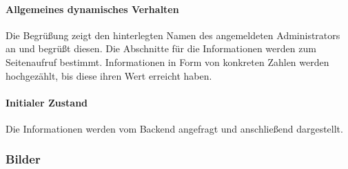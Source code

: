 \paragraph*{Allgemeines dynamisches Verhalten}
Die Begrüßung zeigt den hinterlegten Namen des angemeldeten Administrators an und begrüßt diesen.
Die Abschnitte für die Informationen werden zum Seitenaufruf bestimmt. 
Informationen in Form von konkreten Zahlen werden hochgezählt, bis diese ihren Wert erreicht haben.

\paragraph*{Initialer Zustand}
Die Informationen werden vom Backend angefragt und anschließend dargestellt.

\subsubsection*{Bilder}
\begin{minipage}{\linewidth}
    \centering
    \begin{minipage}{.69\textwidth}
        \captionsetup[figure]{labelformat=empty}
        \captionsetup[figure]{labelformat=default}
    \end{minipage}
    \begin{minipage}{.3\textwidth}
        \captionsetup[figure]{labelformat=empty}
        \captionsetup[figure]{labelformat=default}
    \end{minipage}
\end{minipage}
